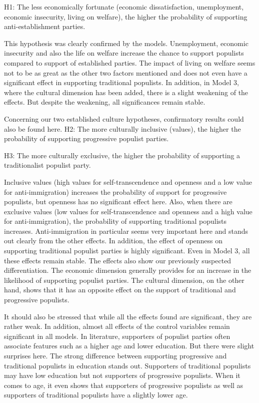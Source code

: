 \documentclass[]{article}
\begin{document}
H1: The less economically fortunate (economic dissatisfaction,
unemployment, economic insecurity, living on welfare), the higher the
probability of supporting anti-establishment parties.

This hypothesis was clearly confirmed by the models. Unemployment,
economic insecurity and also the life on welfare increase the chance to
support populists compared to support of established parties. The impact
of living on welfare seems not to be as great as the other two factors
mentioned and does not even have a significant effect in supporting
traditional populists. In addition, in Model 3, where the cultural
dimension has been added, there is a slight weakening of the effects.
But despite the weakening, all significances remain stable.

Concerning our two established culture hypotheses, confirmatory results
could also be found here. H2: The more culturally inclusive (values),
the higher the probability of supporting progressive populist parties.

H3: The more culturally exclusive, the higher the probability of
supporting a traditionalist populist party.

Inclusive values (high values for self-transcendence and openness and a
low value for anti-immigration) increases the probability of support for
progressive populists, but openness has no significant effect here.
Also, when there are exclusive values (low values for self-transcendence
and openness and a high value for anti-immigration), the probability of
supporting traditional populists increases. Anti-immigration in
particular seems very important here and stands out clearly from the
other effects. In addition, the effect of openness on supporting
traditional populist parties is highly significant. Even in Model 3, all
these effects remain stable. The effects also show our previously
suspected differentiation. The economic dimension generally provides for
an increase in the likelihood of supporting populist parties. The
cultural dimension, on the other hand, shows that it has an opposite
effect on the support of traditional and progressive populists.

It should also be stressed that while all the effects found are
significant, they are rather weak. In addition, almost all effects of
the control variables remain significant in all models. In literature,
supporters of populist parties often associate features such as a higher
age and lower education. But there were slight surprises here. The
strong difference between supporting progressive and traditional
populists in education stands out. Supporters of traditional populists
may have low education but not supporters of progressive populists. When
it comes to age, it even shows that supporters of progressive populists
as well as supporters of traditional populists have a slightly lower
age.
\end{document}
